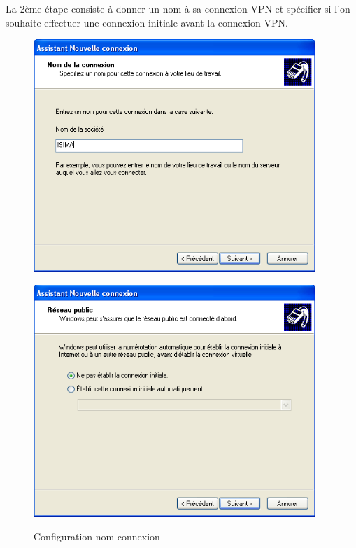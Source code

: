 La 2ème étape consiste à donner un nom à sa connexion VPN et spécifier si l'on souhaite effectuer une connexion initiale avant la connexion VPN.

\begin{figure}[H]
	\begin{minipage}{0.5\textwidth}
		\begin{flushleft} \large
			\includegraphics[width=0.95\textwidth]{partie_2/screen_windows/etape3.PNG}\\
		\end{flushleft}
	\end{minipage}
	\begin{minipage}{0.5\textwidth}
		\begin{flushright} \large
			\includegraphics[width=0.95\textwidth]{partie_2/screen_windows/etape4.PNG}\\
		\end{flushright}
	\end{minipage}
	\caption{Configuration nom connexion}
	\label{VPN_ETAPE2}
\end{figure}
~\


